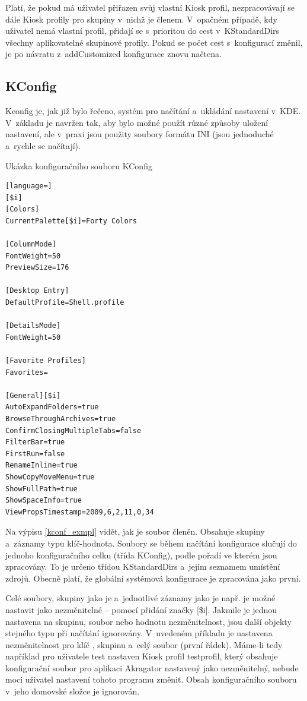 Platí, že pokud má uživatel přiřazen svůj vlastní Kiosk profil, nezpracovávají se dále Kiosk profily pro skupiny v~nichž je členem. V~opačném případě, kdy uživatel nemá vlastní profil, přidají se s~prioritou do cest v~KStandardDirs všechny aplikovatelné skupinové profily. Pokud se počet cest s~konfigurací změnil, je po návratu z~addCustomized konfigurace znovu načtena.

\subsection*{KConfig}
Kconfig je, jak již bylo řečeno, systém pro načítání a~ukládání nastavení v~KDE. V~základu je navržen tak, aby bylo možné použít různé způsoby uložení nastavení, ale v~praxi jsou použity soubory formátu INI (jsou jednoduché a~rychle se načítají).
\begin{mylisting}
\caption{Ukázka konfiguračního souboru KConfig}
\label{kconf_exmpl}
\begin{lstlisting}[language=]
[$i]
[Colors]
CurrentPalette[$i]=Forty Colors

[ColumnMode]
FontWeight=50
PreviewSize=176

[Desktop Entry]
DefaultProfile=Shell.profile

[DetailsMode]
FontWeight=50

[Favorite Profiles]
Favorites=

[General][$i]
AutoExpandFolders=true
BrowseThroughArchives=true
ConfirmClosingMultipleTabs=false
FilterBar=true
FirstRun=false
RenameInline=true
ShowCopyMoveMenu=true
ShowFullPath=true
ShowSpaceInfo=true
ViewPropsTimestamp=2009,6,2,11,0,34
\end{lstlisting}
\end{mylisting}

Na výpisu \ref{kconf_exmpl} vidět, jak je soubor členěn. Obsahuje skupiny a~záznamy typu klíč-hodnota. Soubory se během načítání konfigurace slučují do jednoho konfiguračního celku (třída KConfig), podle pořadí ve kterém jsou zpracovány. To je určeno třídou KStandardDirs a~jejím seznamem umístění zdrojů. Obecně platí, že globální systémová konfigurace je zpracována jako první.

Celé soubory, skupiny jako je  a~jednotlivé záznamy jako je např. \linebreak{} je možné nastavit jako nezměnitelné --  pomocí přidání značky [\$i]. Jakmile je jednou nastavena na skupinu, soubor nebo hodnotu nezměnitelnost, jsou další objekty stejného typu při načítání ignorovány. V~uvedeném příkladu je nastavena nezměnitelnost pro klíč , skupinu  a~celý soubor (první řádek). Máme-li tedy například pro uživatele test nastaven Kiosk profil testprofil, který obsahuje konfigurační soubor pro aplikaci Akragator nastavený jako nezměnitelný, nebude moci uživatel nastavení tohoto programu změnit. Obsah konfiguračního souboru v~jeho domovské složce je ignorován.

